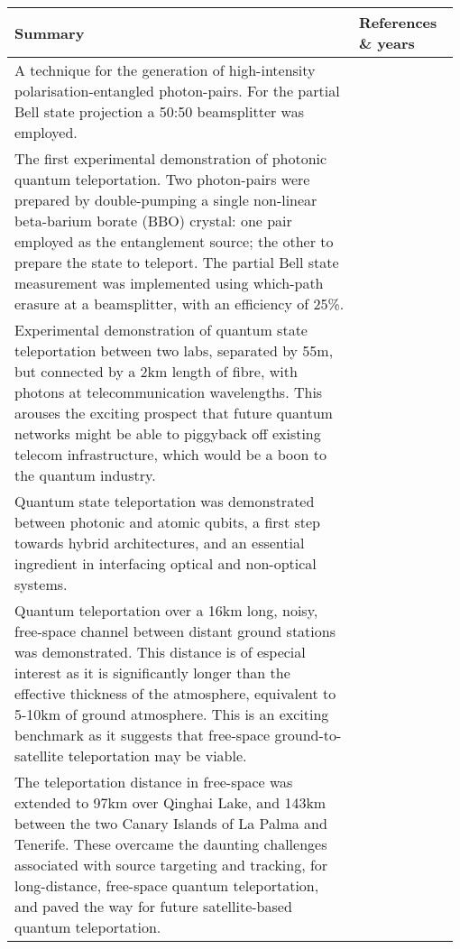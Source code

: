 \begin{table*}[!htbp]
\begin{tabular}{|p{0.755\linewidth}|p{0.22\linewidth}|}
	\hline
	\textbf{Summary} & \textbf{References \& years} \\
	\hline \hline
	A technique for the generation of high-intensity polarisation-entangled photon-pairs. For the partial Bell state projection a 50:50 beamsplitter was employed. & \cite{bib:PhysRevLett.75.4337, bib:Euro_25_559} \\
	\hline
	The first experimental demonstration of photonic quantum teleportation. Two photon-pairs were prepared by double-pumping a single non-linear beta-barium borate (BBO) crystal: one pair employed as the entanglement source; the other to prepare the state to teleport. The partial Bell state measurement was implemented using which-path erasure at a beamsplitter, with an efficiency of 25\%. & \cite{bib:Boumeester97} \\
	\hline
	Experimental demonstration of quantum state teleportation between two labs, separated by 55m, but connected by a 2km length of fibre, with photons at telecommunication wavelengths. This arouses the exciting prospect that future quantum networks might be able to piggyback off existing telecom infrastructure, which would be a boon to the quantum industry. & \cite{bib:Nat_421_509} \\
	\hline
	Quantum state teleportation was demonstrated between photonic and atomic qubits, a first step towards hybrid architectures, and an essential ingredient in interfacing optical and non-optical systems. & \cite{bib:Chen08} \\
	\hline
	Quantum teleportation over a 16km long, noisy, free-space channel between distant ground stations was demonstrated. This distance is of especial interest as it is significantly longer than the effective thickness of the atmosphere, equivalent to 5-10km of ground atmosphere. This is an exciting benchmark as it suggests that free-space ground-to-satellite teleportation may be viable. & \cite{bib:Nat_Phot_4_376, bib:PRL_94_150501} \\
	\hline
	The teleportation distance in free-space was extended to 97km over Qinghai Lake, and 143km between the two Canary Islands of La Palma and Tenerife. These overcame the daunting challenges associated with source targeting and tracking, for long-distance, free-space quantum teleportation, and paved the way for future satellite-based quantum teleportation. & \cite{bib:Nat_488_185, bib:Nat_489_269} \\

\end{tabular}
\end{table*}
